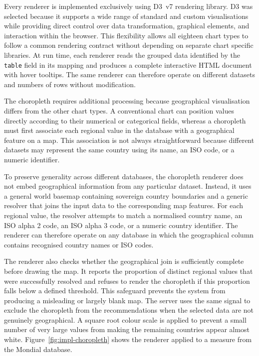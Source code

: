 Every renderer is implemented exclusively using D3~v7 rendering library. D3 was selected because it supports a wide range of standard and custom visualisations while providing direct control over data transformation, graphical elements, and interaction within the browser. This flexibility allows all eighteen chart types to follow a common rendering contract without depending on separate chart specific libraries. At run time, each renderer reads the grouped data identified by the \texttt{table} field in its mapping and produces a complete interactive HTML document with hover tooltips. The same renderer can therefore operate on different datasets and numbers of rows without modification.

The choropleth requires additional processing because geographical visualisation differs from the other chart types. A conventional chart can position values directly according to their numerical or categorical fields, whereas a choropleth must first associate each regional value in the database with a geographical feature on a map. This association is not always straightforward because different datasets may represent the same country using its name, an ISO code, or a numeric identifier.

To preserve generality across different databases, the choropleth renderer does not embed geographical information from any particular dataset. Instead, it uses a general world basemap containing sovereign country boundaries and a generic resolver that joins the input data to the corresponding map features. For each regional value, the resolver attempts to match a normalised country name, an ISO alpha 2 code, an ISO alpha 3 code, or a numeric country identifier. The renderer can therefore operate on any database in which the geographical column contains recognised country names or ISO codes.

The renderer also checks whether the geographical join is sufficiently complete before drawing the map. It reports the proportion of distinct regional values that were successfully resolved and refuses to render the choropleth if this proportion falls below a defined threshold. This safeguard prevents the system from producing a misleading or largely blank map. The server uses the same signal to exclude the choropleth from the recommendations when the selected data are not genuinely geographical. A square root colour scale is applied to prevent a small number of very large values from making the remaining countries appear almost white. Figure~\ref{fig:impl-choropleth} shows the renderer applied to a measure from the Mondial database.


